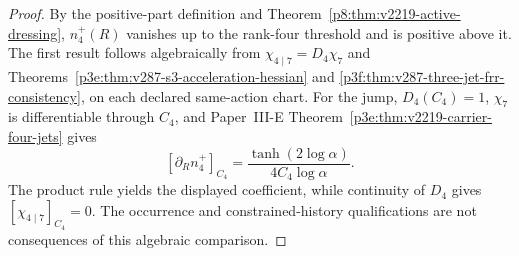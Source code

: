 \documentclass[12pt,a4paper]{article}
\begin{document}
\begin{proof}
By the positive-part definition and
Theorem~\ref{p8:thm:v2219-active-dressing},
$n_4^+(R)$ vanishes
up to the rank-four threshold and is positive above it. The first
result follows algebraically from $\chi_{4\mid7}=D_4\chi_7$ and
Theorems~\ref{p3e:thm:v287-s3-acceleration-hessian} and
\ref{p3f:thm:v287-three-jet-frr-consistency}, on each declared
same-action chart.  For the jump, $D_4(C_4)=1$,
$\chi_7$ is differentiable through $C_4$, and Paper~III-E
Theorem~\ref{p3e:thm:v2219-carrier-four-jets} gives
\[
 [\partial_Rn_4^+]_{C_4}
 =\frac{\tanh(2\log\alpha)}{4C_4\log\alpha}.
\]
The product rule yields the displayed coefficient, while continuity
of $D_4$ gives $[\chi_{4\mid7}]_{C_4}=0$.
The occurrence and constrained-history qualifications are not
consequences of this algebraic comparison.
\end{proof}
\end{document}
